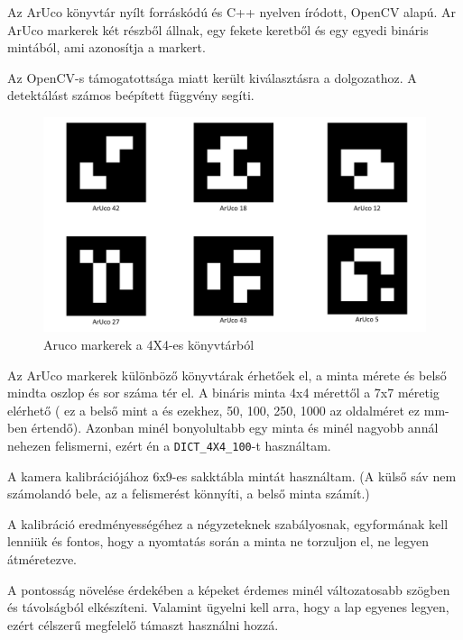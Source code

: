 Az ArUco könyvtár nyílt forráskódú és C++ nyelven íródott, OpenCV alapú. 
Ar ArUco markerek két részből állnak, egy fekete keretből és egy egyedi bináris mintából, ami azonosítja a markert.

Az OpenCV-s támogatottsága miatt került kiválasztásra a dolgozathoz. A detektálást számos beépített függvény segíti.\\

\begin{figure}[htp]
    \centering
   	\includegraphics[width=4.8truecm, height=3truecm]{images/kep.png}
	\caption{Aruco markerek a 4X4-es könyvtárból}
\end{figure}


Az ArUco markerek különböző könyvtárak érhetőek el, a minta mérete és belső mindta oszlop és sor száma tér el. A bináris minta  4x4 mérettől a 7x7 méretig elérhető ( ez a belső mint a és ezekhez, 50, 100, 250, 1000 az oldalméret ez mm-ben értendő). Azonban minél bonyolultabb egy minta és minél nagyobb annál nehezen felismerni, ezért én a  \texttt{DICT\_4X4\_100}-t használtam.



A kamera kalibrációjához 6x9-es sakktábla mintát használtam. (A külső sáv nem számolandó bele, az a felismerést könnyíti, a belső minta számít.) 

A kalibráció eredményességéhez a négyzeteknek szabályosnak, egyformának kell lenniük és fontos, hogy a nyomtatás során a minta ne torzuljon el, ne legyen átméretezve. 

A pontosság növelése érdekében a képeket érdemes minél változatosabb szögben és távolságból elkészíteni. Valamint ügyelni kell arra, hogy a lap egyenes legyen, ezért célszerű megfelelő támaszt használni hozzá.

